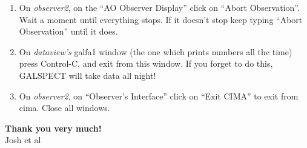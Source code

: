 \begin{enumerate}
\begin{enumerate}
\item  On {\it observer2}, on the ``AO Observer Display'' click on ``Abort
Observation''. Wait a moment until everything stops. If it doesn't
stop keep typing ``Abort Observation'' until it does.

\item On {\it dataview's} galfa1 window 
(the one which prints numbers all the time) 
press Control-C, and exit from this window. 
If you forget to do this, GALSPECT will take data
all night!

\item On {\it observer2}, on ``Observer's Interface'' click on 
``Exit CIMA'' to exit from cima. Close all windows. 
\end{enumerate}
\end{enumerate}

{\bf Thank you very much!}\\

Josh et al







